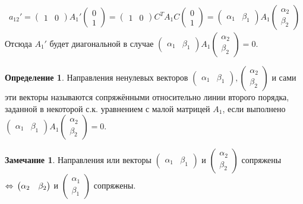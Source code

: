 \documentclass[a4paper, 12pt]{article}
\theoremstyle{definition}
\newtheorem*{definition}{Определение}
\newtheorem*{remark}{Замечание}
\begin{document}
\begin{align*}
		a_{12}' = \begin{pmatrix} 1 & 0 \end{pmatrix}A_1'\begin{pmatrix} 0 \\ 1 \end{pmatrix} = \begin{pmatrix} 1 & 0 \end{pmatrix}C^TA_1C\begin{pmatrix} 0 \\ 1 \end{pmatrix} = \begin{pmatrix} \alpha_1 & \beta_1 \end{pmatrix}A_1\begin{pmatrix} \alpha_2 \\ \beta_2 \end{pmatrix}
	\end{align*}
	Отсюда $A_1'$ будет диагональной в случае $\begin{pmatrix} \alpha_1 & \beta_1 \end{pmatrix}A_1\begin{pmatrix} \alpha_2 \\ \beta_2 \end{pmatrix} = 0$.
	\begin{definition}
		Направления ненулевых векторов $\begin{pmatrix} \alpha_1 & \beta_1 \end{pmatrix}, \begin{pmatrix} \alpha_2 \\ \beta_2 \end{pmatrix}$ и сами эти векторы называются сопряжёнными относительно линии второго порядка, заданной в некоторой с.к. уравнением с малой матрицей $A_1$, если выполнено $\begin{pmatrix} \alpha_1 & \beta_1 \end{pmatrix}A_1\begin{pmatrix} \alpha_2 \\ \beta_2 \end{pmatrix} = 0$.
	\end{definition}
	\begin{remark}
		Направления или векторы $\begin{pmatrix} \alpha_1 & \beta_1 \end{pmatrix}$ и $\begin{pmatrix} \alpha_2 \\ \beta_2 \end{pmatrix}$ сопряжены $\Leftrightarrow \\\begin{pmatrix} \alpha_2 & \beta_2 \end{pmatrix}$ и $\begin{pmatrix} \alpha_1 \\ \beta_1 \end{pmatrix}$ сопряжены.
	\end{remark}
\end{document}
